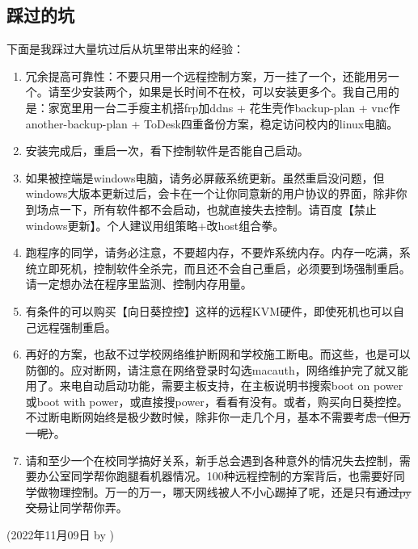 \subsection{踩过的坑}
下面是我踩过大量坑过后从坑里带出来的经验：
\begin{enumerate}
    \item 冗余提高可靠性：不要只用一个远程控制方案，万一挂了一个，还能用另一个。请至少安装两个，如果是长时间不在校，可以安装更多个。我自己用的是：家宽里用一台二手瘦主机搭frp加ddns + 花生壳作backup-plan + vnc作another-backup-plan + ToDesk四重备份方案，稳定访问校内的linux电脑。
    \item 安装完成后，重启一次，看下控制软件是否能自己启动。
    \item 如果被控端是windows电脑，请务必屏蔽系统更新。虽然重启没问题，但windows大版本更新过后，会卡在一个让你同意新的用户协议的界面，除非你到场点一下，所有软件都不会启动，也就直接失去控制。请百度【禁止windows更新】。个人建议用组策略+改host组合拳。
    \item 跑程序的同学，请务必注意，不要超内存，不要炸系统内存。内存一吃满，系统立即死机，控制软件全杀完，而且还不会自己重启，必须要到场强制重启。请一定想办法在程序里监测、控制内存用量。
    \item 有条件的可以购买【向日葵控控】这样的远程KVM硬件，即使死机也可以自己远程强制重启。
    \item 再好的方案，也敌不过学校网络维护断网和学校施工断电。而这些，也是可以防御的。应对断网，请注意在网络登录时勾选macauth，网络维护完了就又能用了。来电自动启动功能，需要主板支持，在主板说明书搜索boot on power或boot with power，或直接搜power，看看有没有。或者，购买向日葵控控。不过断电断网始终是极少数时候，除非你一走几个月，基本不需要考虑\sout{（但万一呢）}。
    \item 请和至少一个在校同学搞好关系，新手总会遇到各种意外的情况失去控制，需要办公室同学帮你跑腿看机器情况。100种远程控制的方案背后，也需要好同学做物理控制。万一的万一，哪天网线被人不小心踢掉了呢，还是只有\sout{通过py交易}让同学帮你弄。
\end{enumerate}

\begin{flushright}
(2022年11月09日 by \Wu)
\end{flushright}





% 
